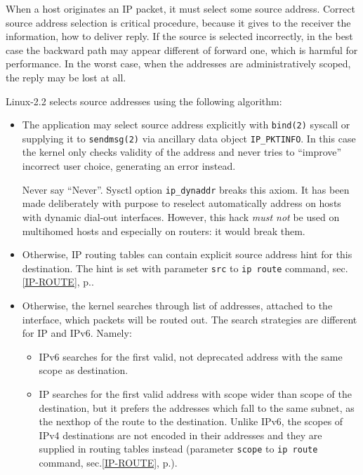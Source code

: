 When a host originates an IP packet, it must select some source
address. Correct source address selection is critical procedure,
because it gives to the receiver the information, how to deliver
reply. If the source is selected incorrectly, in the best case
the backward path may appear different of forward one, which
is harmful for performance. In the worst case, when the addresses
are administratively scoped, the reply may be lost at all.

Linux-2.2 selects source addresses using the following algorithm:

\begin{itemize}
\item
The application may select source address explicitly with \verb|bind(2)|
syscall or supplying it to \verb|sendmsg(2)| via ancillary data object
\verb|IP_PKTINFO|. In this case the kernel only checks validity
of the address and never tries to ``improve'' incorrect user choice,
generating an error instead.
\begin{NB}
 Never say ``Never''. Sysctl option \verb|ip_dynaddr| breaks
 this axiom. It has been made deliberately with purpose
 to reselect automatically address on hosts with dynamic dial-out interfaces.
 However, this hack {\em must not\/} be used on multihomed hosts
 and especially on routers: it would break them.
\end{NB}


\item Otherwise, IP routing tables can contain explicit source
address hint for this destination. The hint is set with parameter \verb|src|
to \verb|ip route| command, sec.\ref{IP-ROUTE}, p.\pageref{IP-ROUTE}.


\item Otherwise, the kernel searches through list of addresses,
attached to the interface, which packets will be routed out.
The search strategies are different for IP and IPv6. Namely:

\begin{itemize}
\item IPv6 searches for the first valid, not deprecated address
with the same scope as destination.

\item IP searches for the first valid address with scope wider
than scope of the destination, but it prefers the addresses
which fall to the same subnet, as the nexthop of the route
to the destination. Unlike IPv6, the scopes of IPv4 destinations
are not encoded in their addresses and they are supplied
in routing tables instead (parameter \verb|scope| to \verb|ip route| command,
sec.\ref{IP-ROUTE}, p.\pageref{IP-ROUTE}).


\end{itemize}
\end{itemize}
